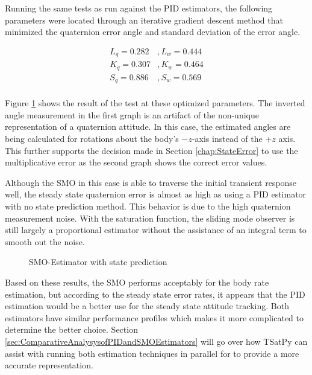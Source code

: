 Running the same tests as run against the PID estimators, the following parameters were located through an iterative gradient descent method that minimized the quaternion error angle and standard deviation of the error angle.

\begin{equation}
  \begin{aligned}
    L_q = 0.282 &, L_w = 0.444 \\
    K_q = 0.307 &, K_w = 0.464 \\
    S_q = 0.886 &, S_w = 0.569 \\
  \end{aligned}
\end{equation}

Figure \ref{fig:SMOEstimatorwithstateprediction} shows the result of the test at these optimized parameters.  The inverted angle measurement in the first graph is an artifact of the non-unique representation of a quaternion attitude.  In this case, the estimated angles are being calculated for rotations about the body's $-z$-axis instead of the $+z$ axis.  This further supports the decision made in Section \ref{chap:StateError} to use the multiplicative error as the second graph shows the correct error values.

Although the SMO in this case is able to traverse the initial transient response well, the steady state quaternion error is almost as high as using a PID estimator with no state prediction method.  This behavior is due to the high quaternion measurement noise.  With the saturation function, the sliding mode observer is still largely a proportional estimator without the assistance of an integral term to smooth out the noise.

\begin{figure}[H]
  \centerline{}
  \caption{SMO-Estimator with state prediction}
  \label{fig:SMOEstimatorwithstateprediction}
\end{figure}

Based on these results, the SMO performs acceptably for the body rate estimation, but according to the steady state error rates, it appears that the PID estimation would be a better use for the steady state attitude tracking.  Both estimators have similar performance profiles which makes it more complicated to determine the better choice.  Section \ref{sec:ComparativeAnalysysofPIDandSMOEstimators} will go over how TSatPy can assist with running both estimation techniques in parallel for to provide a more accurate representation.

